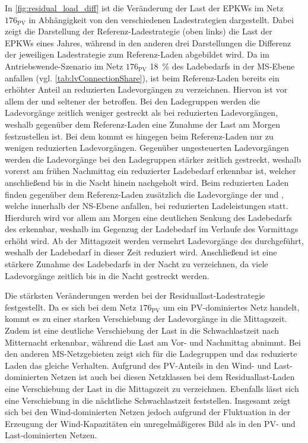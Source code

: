 

In \autoref{fig:residual_load_diff} ist die Veränderung der Last der \glspl{EPKW} im Netz \(176_{\text{PV}}\) in Abhängigkeit von den verschiedenen Ladestrategien dargestellt.
Dabei zeigt die Darstellung der Referenz-Ladestrategie (oben links) die Last der \glspl{EPKW} eines Jahres, während in den anderen drei Darstellungen die Differenz der jeweiligen Ladestrategie zum Referenz-Laden abgebildet wird.
Da im Antriebswende-Szenario im Netz \(176_{\text{PV}}\) \SI{18}{\percent} des Ladebedarfs in der \gls{MS}-Ebene anfallen (vgl. \autoref{tab:lvConnectionShare}), ist beim Referenz-Laden bereits ein erhöhter Anteil an reduzierten Ladevorgängen zu verzeichnen.
Hiervon ist vor allem der \UC \Firmeparkplatz und seltener der \UC \zH betroffen.
Bei den Ladegruppen werden die Ladevorgänge zeitlich weniger gestreckt als bei reduzierten Ladevorgängen, weshalb gegenüber dem Referenz-Laden eine Zunahme der Last am Morgen festzustellen ist.
Bei dem \UC \zH kommt es hingegen beim Referenz-Laden nur zu wenigen reduzierten Ladevorgängen.
Gegenüber ungesteuerten Ladevorgängen werden die Ladevorgänge bei den Ladegruppen stärker zeitlich gestreckt, weshalb vorerst am frühen Nachmittag ein reduzierter Ladebedarf erkennbar ist, welcher anschließend bis in die Nacht hinein nachgeholt wird.
Beim reduzierten Laden finden gegenüber dem Referenz-Laden zusätzlich die Ladevorgänge der \UCs \zH und \Firmeparkplatzdot, welche innerhalb der \gls{NS}-Ebene anfallen, bei reduzierten Ladeleistungen statt.
Hierdurch wird vor allem am Morgen eine deutlichen Senkung des Ladebedarfs des \UC \Firmeparkplatz erkennbar, weshalb im Gegenzug der Ladebedarf im Verlaufe des Vormittags erhöht wird.
Ab der Mittagszeit werden vermehrt Ladevorgänge des \UC \zH durchgeführt, weshalb der Ladebedarf in dieser Zeit reduziert wird.
Anschließend ist eine stärkere Zunahme des Ladebedarfs in der Nacht zu verzeichnen, da viele Ladevorgänge zeitlich bis in die Nacht gestreckt werden.

Die stärksten Veränderungen werden bei der Residuallast-Ladestrategie festgestellt.
Da es sich bei dem Netz \(176_{\text{PV}}\) um ein \gls{PV}-dominiertes Netz handelt, kommt es zu einer starken Verschiebung der Ladevorgänge in die Mittagszeit.
Zudem ist eine deutliche Verschiebung der Last in die Schwachlastzeit nach Mitternacht erkennbar, während die Last am Vor- und Nachmittag abnimmt.
Bei den anderen \gls{MS}-Netzgebieten zeigt sich für die Ladegruppen und das reduzierte Laden das gleiche Verhalten.
Aufgrund des \gls{PV}-Anteils in den Wind- und Last-dominierten Netzen ist auch bei diesen Netzklassen bei dem Residuallast-Laden eine Verschiebung der Last in die Mittagszeit zu verzeichnen.
Ebenfalls lässt sich eine Verschiebung in die nächtliche Schwachlastzeit feststellen.
Insgesamt zeigt sich bei den Wind-dominierten Netzen jedoch aufgrund der Fluktuation in der Erzeugung der Wind-Kapazitäten ein unregelmäßigeres Bild als in den \gls{PV}- und Last-dominierten Netzen.


